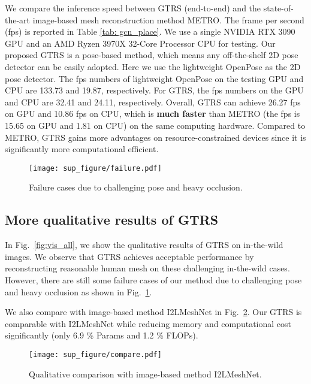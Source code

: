 \documentclass[sigconf]{acmart}
\begin{document}
We compare the inference speed between GTRS (end-to-end) and the state-of-the-art image-based mesh reconstruction method METRO\cite{lin2021metro}. The frame per second (fps) is reported in Table \ref{tab: gcn_place}. We use a single NVIDIA RTX 3090 GPU and an AMD Ryzen 3970X 32-Core Processor CPU for testing. Our proposed GTRS is a pose-based method, which means any off-the-shelf 2D pose detector can be easily adopted. Here we use the lightweight OpenPose \cite{osokin2018lightweight_openpose} as the 2D pose detector. The fps numbers of lightweight OpenPose on the testing GPU and CPU are 133.73 and 19.87, respectively. For GTRS, the fps numbers on the GPU and CPU are 32.41 and 24.11, respectively. Overall, GTRS can achieve 26.27 fps on GPU and 10.86 fps on CPU, which is \textbf{much faster} than METRO (the fps is 15.65 on GPU and 1.81 on CPU) on the same computing hardware. Compared to METRO, GTRS gains more advantages on resource-constrained devices since it is significantly more computational efficient.


\begin{figure}[htp]
\vspace{-5pt}
  \centering
  \texttt{[image: sup\_figure/failure.pdf]}
  \vspace{-5pt}
  \caption{Failure cases due to challenging pose and heavy occlusion. }
  \label{fig:failure}
\end{figure}



\subsection{More qualitative results of GTRS}
In Fig.~\ref{fig:vis_all}, we show the qualitative results of GTRS on in-the-wild images. We observe that GTRS achieves acceptable performance by reconstructing reasonable human mesh on these challenging in-the-wild cases. 
However, there are still some failure cases of our method due to challenging pose and heavy occlusion as shown in Fig.~\ref{fig:failure}.  

We also compare with image-based method I2LMeshNet \cite{Moon_I2L_MeshNet} in Fig.~\ref{fig:compare}. Our GTRS is comparable with I2LMeshNet while reducing memory and computational cost significantly (only 6.9 \% Params and 1.2 \% FLOPs). 

\begin{figure}[htp]
\vspace{-5pt}
  \centering
  \texttt{[image: sup\_figure/compare.pdf]}
  \vspace{-5pt}
  \caption{Qualitative comparison with image-based method I2LMeshNet.}
  \label{fig:compare}
\end{figure}


\newpage



\newpage



\end{document}
